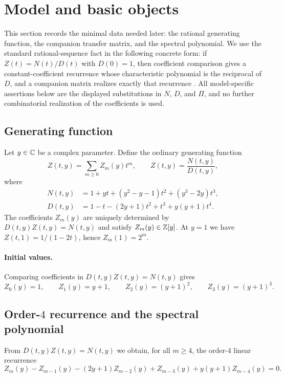 \section{Model and basic objects}\label{sec:model}

This section records the minimal data needed later: the rational generating function, the companion transfer matrix, and the spectral polynomial.
We use the standard rational-sequence fact in the following concrete form: if \(Z(t)=N(t)/D(t)\) with \(D(0)=1\), then coefficient comparison gives a constant-coefficient recurrence whose characteristic polynomial is the reciprocal of \(D\), and a companion matrix realizes exactly that recurrence \cite{FlajoletSedgewick2009,Stanley2012}.
All model-specific assertions below are the displayed substitutions in \(N\), \(D\), and \(\Pi\), and no further combinatorial realization of the coefficients is used.

\subsection{Generating function}
\label{subsec:ogf}

Let \(y\in\mathbb{C}\) be a complex parameter. Define the ordinary generating function
\[
Z(t,y)=\sum_{m\ge 0} Z_m(y)t^m,
\qquad
Z(t,y)=\frac{N(t,y)}{D(t,y)},
\]
where
\begin{align*}
N(t,y) &= 1+yt+(y^2-y-1)t^2+(y^3-2y)t^3,\\
D(t,y) &= 1-t-(2y+1)t^2+t^3+y(y+1)t^4.
\end{align*}
The coefficients \(Z_m(y)\) are uniquely determined by \(D(t,y)Z(t,y)=N(t,y)\) and satisfy \(Z_m(y)\in\mathbb{Z}[y]\).
At \(y=1\) we have \(Z(t,1)=1/(1-2t)\), hence \(Z_m(1)=2^m\).

\paragraph{Initial values.}
Comparing coefficients in \(D(t,y)Z(t,y)=N(t,y)\) gives
\[
Z_0(y)=1,\qquad Z_1(y)=y+1,\qquad Z_2(y)=(y+1)^2,\qquad Z_3(y)=(y+1)^3.
\]

\subsection{Order-\texorpdfstring{\(4\)}{4} recurrence and the spectral polynomial}
\label{subsec:recurrence}

From \(D(t,y)Z(t,y)=N(t,y)\) we obtain, for all \(m\ge 4\), the order-\(4\) linear recurrence
\begin{equation}\label{eq:recurrence}
Z_m(y)-Z_{m-1}(y)-(2y+1)Z_{m-2}(y)+Z_{m-3}(y)+y(y+1)Z_{m-4}(y)=0.
\end{equation}

